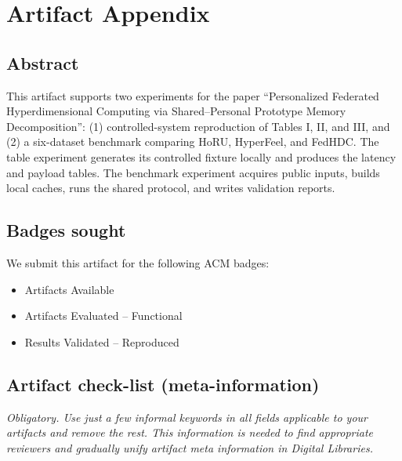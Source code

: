 \documentclass[11pt]{article}
\begin{document}


\appendix
\section{Artifact Appendix}

\subsection{Abstract}

This artifact supports two experiments for the paper
``Personalized Federated Hyperdimensional Computing via Shared--Personal
Prototype Memory Decomposition'': (1) controlled-system reproduction of
Tables I, II, and III, and (2) a six-dataset benchmark comparing HoRU,
HyperFeel, and FedHDC. The table experiment generates its controlled fixture
locally and produces the latency and payload tables. The benchmark experiment
acquires public inputs, builds local caches, runs the shared protocol, and
writes validation reports.

\subsection{Badges sought}

We submit this artifact for the following ACM badges:
\begin{itemize}
  \item Artifacts Available
  \item Artifacts Evaluated -- Functional
  \item Results Validated -- Reproduced
\end{itemize}

\subsection{Artifact check-list (meta-information)}

{\em Obligatory. Use just a few informal keywords in all fields applicable to your artifacts
and remove the rest. This information is needed to find appropriate reviewers and gradually 
unify artifact meta information in Digital Libraries.}
\end{document}
